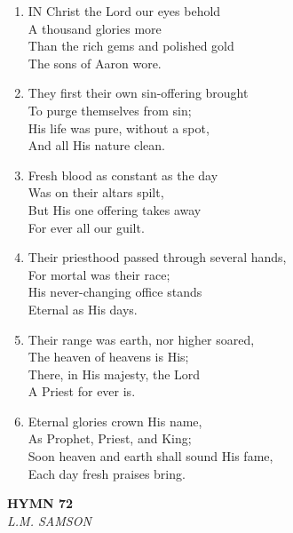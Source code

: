 \begin{enumerate}
    \item IN Christ the Lord our eyes behold \\
        A thousand glories more \\
        Than the rich gems and polished gold \\
        The sons of Aaron wore.

    \item They first their own sin-offering brought \\
        To purge themselves from sin; \\
        His life was pure, without a spot, \\
        And all His nature clean.

    \item Fresh blood as constant as the day \\
        Was on their altars spilt, \\
        But His one offering takes away \\
        For ever all our guilt.

    \item Their priesthood passed through several hands, \\
        For mortal was their race; \\
        His never-changing office stands \\
        Eternal as His days.

    \item Their range was earth, nor higher soared, \\
        The heaven of heavens is His; \\
        There, in His majesty, the Lord \\
        A Priest for ever is.

    \item Eternal glories crown His name, \\
        As Prophet, Priest, and King; \\
        Soon heaven and earth shall sound His fame, \\
        Each day fresh praises bring.

\end{enumerate}

\newpage
\begin{center}
    {\Large \textbf{HYMN 72}}
    \\
    \textit{L.M. SAMSON}
\end{center}
\vspace{1em}

